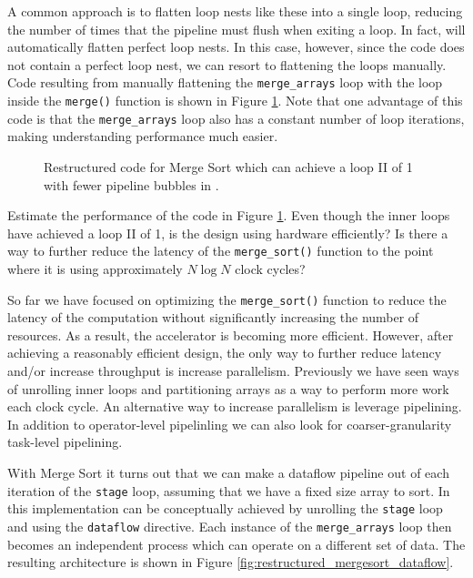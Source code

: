 A common approach is to flatten loop nests like these into a single loop, reducing the number of times that the pipeline must flush when exiting a loop.  In fact, \VHLS will automatically flatten perfect loop nests.  In this case, however, since the code does not contain a perfect loop nest, we can resort to flattening the loops manually.  Code resulting from manually flattening the \lstinline{merge_arrays} loop with the loop inside the \lstinline{merge()} function is shown in Figure \ref{fig:merge_sort_loop_merged.cpp}.  Note that one advantage of this code is that the \lstinline{merge_arrays} loop also has a constant number of loop iterations, making understanding performance much easier.

\begin{figure}

\caption{Restructured code for Merge Sort which can achieve a loop II of 1 with fewer pipeline bubbles in \VHLS.}
\label{fig:merge_sort_loop_merged.cpp}
\end{figure}

\begin{aside}
Estimate the performance of the code in Figure \ref{fig:merge_sort_loop_merged.cpp}.  Even though the inner loops have achieved a loop II of 1, is the design using hardware efficiently?  Is there a way to further reduce the latency of the \lstinline{merge_sort()} function to the point where it is using approximately $N \log N$ clock cycles?
\end{aside}

So far we have focused on optimizing the \lstinline{merge_sort()} function to reduce the latency of the computation without significantly increasing the number of resources.   As a result, the accelerator is becoming more efficient.  However, after achieving a reasonably efficient design, the only way to further reduce latency and/or increase throughput is increase parallelism.  Previously we have seen ways of unrolling inner loops and partitioning arrays as a way to perform more work each clock cycle.  An alternative way to increase parallelism is leverage pipelining.  In addition to operator-level pipelinling we can also look for coarser-granularity task-level pipelining.

With Merge Sort it turns out that we can make a dataflow pipeline out of each iteration of the \lstinline{stage} loop, assuming that we have a fixed size array to sort.  In \VHLS this implementation can be conceptually achieved by unrolling the \lstinline{stage} loop and using the \lstinline{dataflow} directive.  Each instance of the \lstinline{merge_arrays} loop then becomes an independent process which can operate on a different set of data.  The resulting architecture is shown in Figure \ref{fig:restructured_mergesort_dataflow}.  


